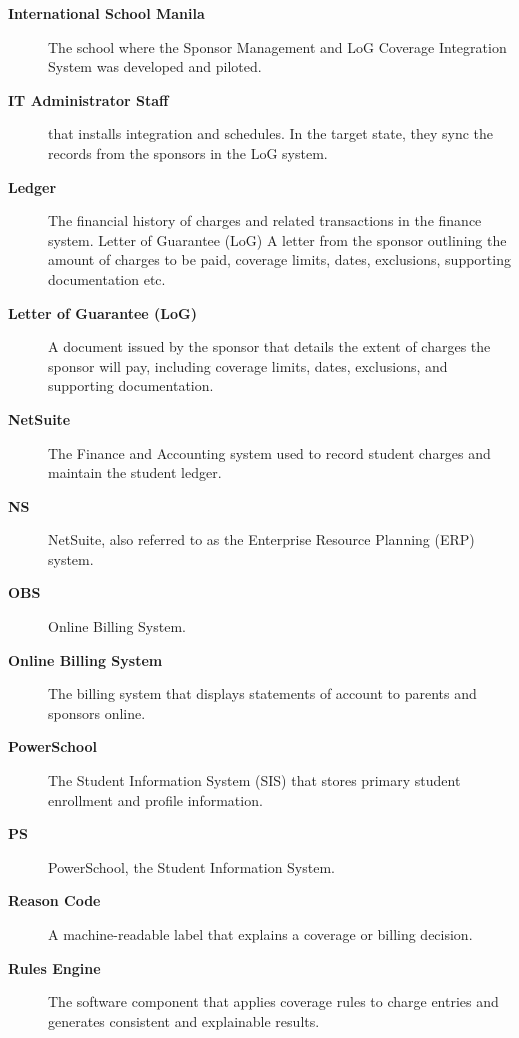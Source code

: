 \begin{description}
    \item[\textbf{International School Manila}] The school where the Sponsor Management and LoG Coverage Integration System was developed and piloted. 
    
    \item[\textbf{IT Administrator Staff}] that installs integration and schedules. In the target state, they sync the records from the sponsors in the LoG system. 
    
    \item[\textbf{Ledger}] The financial history of charges and related transactions in the finance system. Letter of Guarantee (LoG) A letter from the sponsor outlining the amount of charges to be paid, coverage limits, dates, exclusions, supporting documentation etc.

    \item[\textbf{Letter of Guarantee (LoG)}] A document issued by the sponsor that details the extent of charges the sponsor will pay, including coverage limits, dates, exclusions, and supporting documentation.

    \item[\textbf{NetSuite}] The Finance and Accounting system used to record student charges and maintain the student ledger.

    \item[\textbf{NS}] NetSuite, also referred to as the Enterprise Resource Planning (ERP) system.

    \item[\textbf{OBS}] Online Billing System.

    \item[\textbf{Online Billing System}] The billing system that displays statements of account to parents and sponsors online.

    \item[\textbf{PowerSchool}] The Student Information System (SIS) that stores primary student enrollment and profile information.

    \item[\textbf{PS}] PowerSchool, the Student Information System.

    \item[\textbf{Reason Code}] A machine-readable label that explains a coverage or billing decision.

    \item[\textbf{Rules Engine}] The software component that applies coverage rules to charge entries and generates consistent and explainable results.


\end{description}
